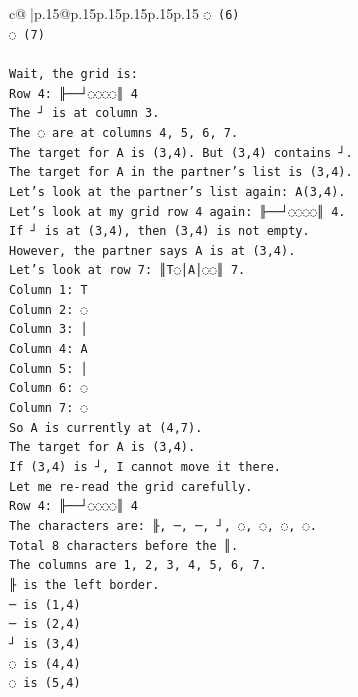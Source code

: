 \documentclass{article}
\begin{document}
{\begin{supertabular}{c@{$\;$}|p{.15\linewidth}@{}p{.15\linewidth}p{.15\linewidth}p{.15\linewidth}p{.15\linewidth}p{.15\linewidth}}
{{{\texttt{◌ (6)} \\
\texttt{◌ (7)} \\
\\ 
\texttt{Wait, the grid is:} \\
\texttt{Row 4: ╟──┘◌◌◌◌║ 4} \\
\texttt{The ┘ is at column 3.} \\
\texttt{The ◌ are at columns 4, 5, 6, 7.} \\
\texttt{The target for A is (3,4). But (3,4) contains ┘.} \\
\texttt{The target for A in the partner's list is (3,4).} \\
\texttt{Let's look at the partner's list again: A(3,4).} \\
\texttt{Let's look at my grid row 4 again: ╟──┘◌◌◌◌║ 4.} \\
\texttt{If ┘ is at (3,4), then (3,4) is not empty.} \\
\texttt{However, the partner says A is at (3,4).} \\
\texttt{Let's look at row 7: ║T◌│A│◌◌║ 7.} \\
\texttt{Column 1: T} \\
\texttt{Column 2: ◌} \\
\texttt{Column 3: │} \\
\texttt{Column 4: A} \\
\texttt{Column 5: │} \\
\texttt{Column 6: ◌} \\
\texttt{Column 7: ◌} \\
\texttt{So A is currently at (4,7).} \\
\texttt{The target for A is (3,4).} \\
\texttt{If (3,4) is ┘, I cannot move it there.} \\
\texttt{Let me re{-}read the grid carefully.} \\
\texttt{Row 4: ╟──┘◌◌◌◌║ 4} \\
\texttt{The characters are: ╟, ─, ─, ┘, ◌, ◌, ◌, ◌.} \\
\texttt{Total 8 characters before the ║.} \\
\texttt{The columns are 1, 2, 3, 4, 5, 6, 7.} \\
\texttt{╟ is the left border.} \\
\texttt{─ is (1,4)} \\
\texttt{─ is (2,4)} \\
\texttt{┘ is (3,4)} \\
\texttt{◌ is (4,4)} \\
\texttt{◌ is (5,4)} \\
}}}
\end{supertabular}}
\end{document}
